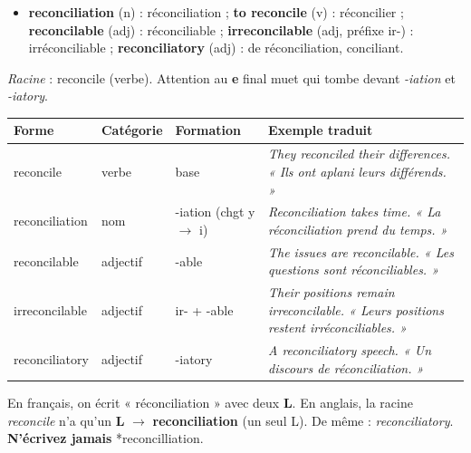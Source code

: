 \documentclass[11pt]{article}
\newcommand{\cle}[1]{{\popxbold\color{popdark}#1}}
\newcommand{\eng}[1]{\ifmmode\text{\textit{#1}}\else\begingroup\selectlanguage{english}\itshape #1\endgroup\fi}
\begin{document}
\begin{definition}[Glossaire]
\begin{itemize}
\item \textbf{reconciliation} (n) : réconciliation ; \textbf{to reconcile} (v) : réconcilier ; \textbf{reconcilable} (adj) : réconciliable ; \textbf{irreconcilable} (adj, préfixe \cle{ir-}) : irréconciliable ; \textbf{reconciliatory} (adj) : de réconciliation, conciliant.
\end{itemize}
\end{definition}

\begin{propriete}
\emph{Racine} : \cle{reconcile} (verbe). Attention au \textbf{e} final muet qui tombe devant \emph{-iation} et \emph{-iatory}.
\begin{center}
\begin{tabularx}{\linewidth}{|X|X|X|X|}
\hline
\rowcolor{popblueL}
\textbf{Forme} & \textbf{Catégorie} & \textbf{Formation} & \textbf{Exemple traduit} \\
\hline
reconcile & verbe & base & \eng{They reconciled their differences.} « Ils ont aplani leurs différends. » \\
\hline
reconciliation & nom & -iation (chgt y $\to$ i) & \eng{Reconciliation takes time.} « La réconciliation prend du temps. » \\
\hline
reconcilable & adjectif & -able & \eng{The issues are reconcilable.} « Les questions sont réconciliables. » \\
\hline
irreconcilable & adjectif & ir- + -able & \eng{Their positions remain irreconcilable.} « Leurs positions restent irréconciliables. » \\
\hline
reconciliatory & adjectif & -iatory & \eng{A reconciliatory speech.} « Un discours de réconciliation. » \\
\hline
\end{tabularx}
\end{center}
\end{propriete}

\begin{attention}
En français, on écrit « réconciliation » avec deux \textbf{L}. En anglais, la racine \emph{reconcile} n'a qu'un \textbf{L} $\to$ \textbf{reconciliation} (un seul L). De même : \emph{reconciliatory}. \textbf{N'écrivez jamais} *reconcilliation.
\end{attention}
\end{document}
